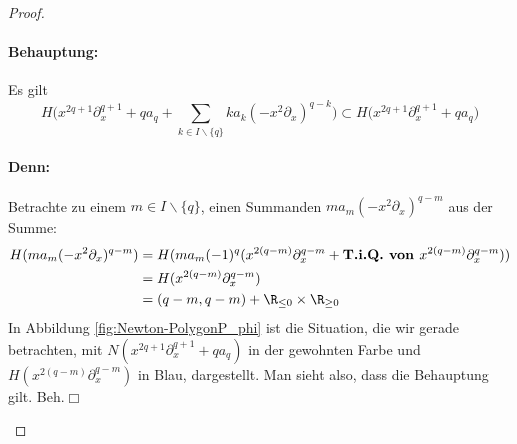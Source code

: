 \begin{proof}
\paragraph{Behauptung:} Es gilt
\[
H\Big(x^{2q + 1}\partial_x^{q + 1} + qa_q
  + \sum_{k\in I\backslash\{q\}}k a_k(-x^2\partial_x)^{q-k} \Big)
\subset H\Big(x^{2q + 1}\partial_x^{q + 1} + qa_q \Big)
\]
\paragraph{Denn:}
Betrachte zu einem $m\in I\backslash \{q\}$, einen Summanden
$ma_m(-x^2\partial_x)^{q-m}$ aus der Summe:
\begin{align*}
H(ma_m(-x^2\partial_x)^{q-m}) &= H(ma_m(-1)^q(x^{2(q-m)}\partial_x^{q-m}
  +\textbf{T.i.Q. von }x^{2(q-m)}\partial_x^{q-m}))
\\&=H(x^{2(q-m)}\partial_x^{q-m})
\\&=(q-m,q-m) + \R_{\leq 0}\times \R_{\geq 0}
\end{align*}
In Abbildung \ref{fig:Newton-PolygonP_phi} ist die Situation, die wir gerade
betrachten, mit $N(x^{2q + 1}\partial_x^{q + 1} + qa_q)$ in der gewohnten Farbe
und $H(x^{2(q-m)}\partial_x^{q-m})$ in Blau, dargestellt.  Man sieht also, dass
die Behauptung gilt.
\hfill Beh.\ensuremath{\Box}

\begin{figure}[htbp] %
\begin{center}
\end{center}
\end{figure}
\end{proof}
